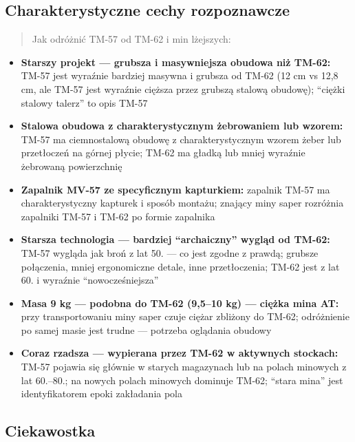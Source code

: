 \documentclass[12pt,oneside]{book}
\providecommand{\tightlist}{%
  \setlength{\itemsep}{0pt}\setlength{\parskip}{0pt}}
\begin{document}
\subsection{Charakterystyczne cechy
rozpoznawcze}\label{charakterystyczne-cechy-rozpoznawcze-129}

\begin{quote}
Jak odróżnić TM-57 od TM-62 i min lżejszych:
\end{quote}

\begin{itemize}
\tightlist
\item
  \textbf{Starszy projekt --- grubsza i masywniejsza obudowa niż TM-62:}
  TM-57 jest wyraźnie bardziej masywna i grubsza od TM-62 (12 cm vs 12,8
  cm, ale TM-57 jest wyraźnie cięższa przez grubszą stalową obudowę);
  ``ciężki stalowy talerz'' to opis TM-57
\item
  \textbf{Stalowa obudowa z charakterystycznym żebrowaniem lub wzorem:}
  TM-57 ma ciemnostalową obudowę z charakterystycznym wzorem żeber lub
  przetłoczeń na górnej płycie; TM-62 ma gładką lub mniej wyraźnie
  żebrowaną powierzchnię
\item
  \textbf{Zapalnik MV-57 ze specyficznym kapturkiem:} zapalnik TM-57 ma
  charakterystyczny kapturek i sposób montażu; znający miny saper
  rozróżnia zapalniki TM-57 i TM-62 po formie zapalnika
\item
  \textbf{Starsza technologia --- bardziej ``archaiczny'' wygląd od
  TM-62:} TM-57 wygląda jak broń z lat 50. --- co jest zgodne z prawdą;
  grubsze połączenia, mniej ergonomiczne detale, inne przetłoczenia;
  TM-62 jest z lat 60. i wyraźnie ``nowocześniejsza''
\item
  \textbf{Masa 9 kg --- podobna do TM-62 (9,5--10 kg) --- ciężka mina
  AT:} przy transportowaniu miny saper czuje ciężar zbliżony do TM-62;
  odróżnienie po samej masie jest trudne --- potrzeba oglądania obudowy
\item
  \textbf{Coraz rzadsza --- wypierana przez TM-62 w aktywnych stockach:}
  TM-57 pojawia się głównie w starych magazynach lub na polach minowych
  z lat 60.--80.; na nowych polach minowych dominuje TM-62; ``stara
  mina'' jest identyfikatorem epoki zakładania pola
\end{itemize}

\subsection{Ciekawostka}\label{ciekawostka-129}
\end{document}
